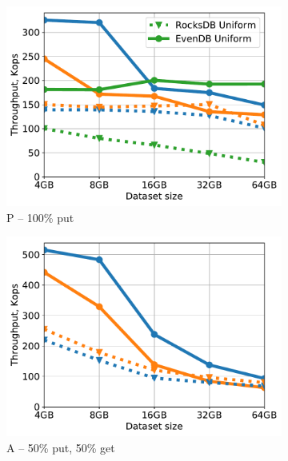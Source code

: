 \begin{figure}[tb]
\centering
\begin{subfigure}{0.33\linewidth}
\includegraphics[width=\textwidth]{figs/Workload_P_line.pdf}
\caption{P -- 100\% put}
\label{fig:throughput:p}
\end{subfigure}
\begin{subfigure}{0.33\linewidth}
\includegraphics[width=\textwidth]{figs/Workload_A_line.pdf}
\caption{A -- 50\% put, 50\% get}
\label{fig:throughput:a}
\end{subfigure}
\begin{subfigure}{0.33\linewidth}

\end{subfigure}
\end{figure}
